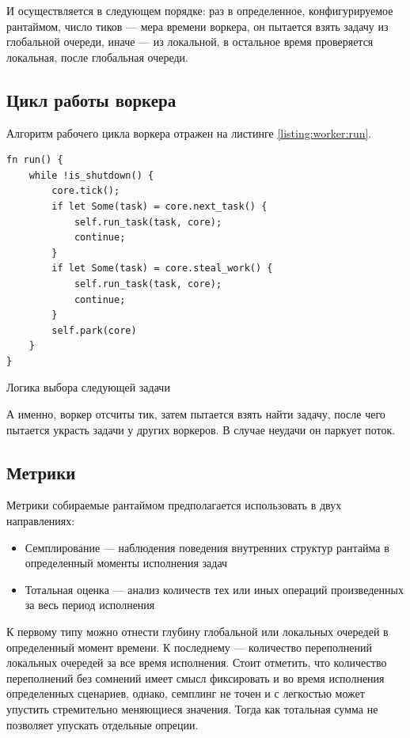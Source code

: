 И осуществляется в следующем порядке: раз в определенное, конфигурируемое рантаймом, число тиков --- мера времени воркера, он пытается взять задачу из глобальной очереди, иначе --- из локальной, в остальное время проверяется локальная, после глобальная очереди.

\subsection{Цикл работы воркера}

Алгоритм рабочего цикла воркера отражен на листинге \ref{listing:worker:run}.

\begin{listing}
    \begin{verbatim}
fn run() {
    while !is_shutdown() {
        core.tick();
        if let Some(task) = core.next_task() {
            self.run_task(task, core);
            continue;
        }
        if let Some(task) = core.steal_work() {
            self.run_task(task, core);
            continue;
        }
        self.park(core)
    }
}
    \end{verbatim}

    \caption{Логика выбора следующей задачи}
    \label{listing:worker:run}
\end{listing}

А именно, воркер отсчиты тик, затем пытается взять найти задачу, после чего пытается украсть задачи у других воркеров. В случае неудачи он паркует поток.

\subsection{Метрики}

Метрики собираемые рантаймом предполагается использовать в двух направлениях:

\begin{itemize}
    \item Семплирование --- наблюдения поведения внутренних структур рантайма в определенный моменты исполнения задач
    \item Тотальная оценка --- анализ количеств тех или иных операций произведенных за весь период исполнения
\end{itemize}

К первому типу можно отнести глубину глобальной или локальных очередей в определенный момент времени. К последнему --- количество переполнений локальных очередей за все время исполнения. Стоит отметить, что количество переполнений без сомнений имеет смысл фиксировать и во время исполнения определенных сценариев, однако, семплинг не точен и с легкостью может упустить стремительно меняющиеся значения. Тогда как тотальная сумма не позволяет упускать отдельные опреции.

